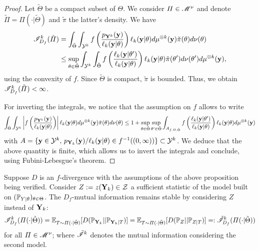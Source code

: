 \begin{proof}
    Let $\tilde\Theta$ be a compact subset of $\Theta$. We consider $\varPi\in\mathscr{M}^\nu$ and denote $\tilde\varPi=\varPi(\cdot|\tilde\Theta)$ and  $\tilde\pi$ the latter's density. We have
        \begin{equation}
        \begin{aligned}
            \mathscr{I}^k_{D_f}(\tilde\varPi) &= \int_{\tilde\Theta}\int_{\mathcal{Y}^k} f\left( \frac{p_{\mathbf{Y}^k}(\mathbf{y})}{\ell_k(\mathbf{y}|\theta)}\right)\ell_k(\mathbf{y}|\theta) d\mu^{\otimes k}(\mathbf{y}) \tilde\pi(\theta)d\nu(\theta) \\
                &\leq \sup_{\theta\in\tilde\Theta}\int_{\mathcal{Y}^k} \int_{\tilde\Theta} f\left( \frac{\ell_k(\mathbf{y}|\theta')}{\ell_k(\mathbf{y}|\theta)}\right)\ell_k(\mathbf{y}|\theta) \tilde\pi(\theta')d\nu(\theta') d\mu^{\otimes k}(\mathbf{y}) ,
        \end{aligned}
        \end{equation}
        using the convexity of $f$. Since $\tilde\Theta$ is compact, $\tilde\pi$ is bounded. Thus, we obtain $\mathscr{I}^k_{D_f}(\tilde\varPi)<\infty$.

        For inverting the integrals, we notice that the assumption on $f$ allows to write 
        \begin{equation}
            \int_{\tilde\Theta}\int_{\mathcal{Y}^k} \left|f\left( \frac{p_{\mathbf{Y}^k}(\mathbf{y})}{\ell_k(\mathbf{y}|\theta)}\right)\right|\ell_k(\mathbf{y}|\theta) d\mu^{\otimes k}(\mathbf{y}) \tilde\pi(\theta)d\nu(\theta) \leq 1 + \sup_{\theta\in\tilde\Theta}\sup_{\theta'\in\tilde\Theta} \int_{A_{f,\varPi,\tilde\Theta}} f\left(\frac{\ell_k(\mathbf{y}|\theta')}{\ell_k(\mathbf{y}|\theta)}  \right) \ell_k(\mathbf{y}|\theta) d\mu^{\otimes k}(\mathbf{y})
        \end{equation}
        with $A=\{\mathbf{y}\in\mathcal{Y}^k,\, p_{\mathbf{Y}_k}(\mathbf{y})/\ell_k(\mathbf{y}|\theta)\in f^{-1}((0,\infty)) \}\subset\mathcal{Y}^k $. We deduce that the above quantity is finite, which allows us to invert the integrals and conclude, using Fubini-Lebesgue's theorem.
\end{proof}

\begin{prop}
    Suppose $D$ is an $f$-divergence with the assumptions of the above proposition being verified.
    Consider $Z:=z(\mathbf{Y}_k)\in\mathcal{Z}$ a sufficient statistic of the model built on $(\mathbb{P}_{Y|\theta})_{\theta\in\Theta}$. %
    The $D_f$-mutual information remains stable by considering $Z$ instead of $\mathbf{Y}_k$:
    \begin{equation}
        \mathscr{I}^k_{D_f}(\varPi(\cdot|\tilde\Theta)) = \mathbb{E}_{T\sim\varPi(\cdot|\tilde\Theta)}[D(\mathbb{P}_{\mathbf{Y}_k}||\mathbb{P}_{\mathbf{Y}_k|T} )] = \mathbb{E}_{T\sim\varPi(\cdot|\tilde\Theta)}[D(\mathbb{P}_{Z}||\mathbb{P}_{Z|T} )] =: \tilde{\mathscr{I}}_{D_f}^k(\varPi(\cdot|\tilde\Theta))
    \end{equation}
    for all $\varPi\in\mathscr{M}^\nu$; where $\tilde{\mathscr{I}}^k$ denotes the mutual information considering the second model.
\end{prop}

